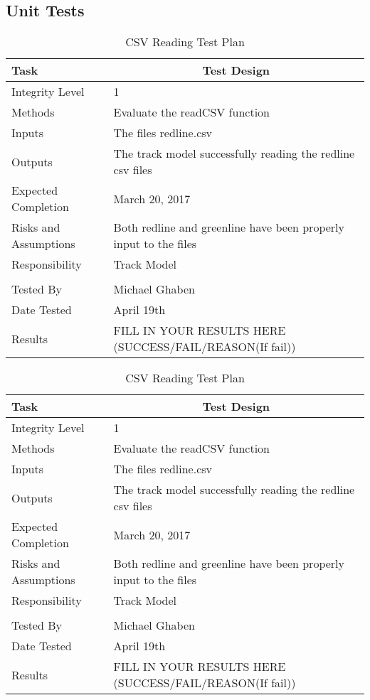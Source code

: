 \documentclass[]{article}
\begin{document}
\subsection{Unit Tests}
\begin{table}[H]
	\centering
	\caption{CSV Reading Test Plan}
	\begin{tabular}{|l|l|}
		\hline
		Task & \multicolumn{1}{c|}{Test Design} \\ \hline
		Integrity Level & 1 \\ \hline
		Methods & Evaluate the readCSV function\\ \hline
		Inputs &  The files redline.csv \\ \hline
		Outputs &  The track model successfully reading the redline csv files\\ \hline
		Expected Completion & March 20, 2017\\ \hline
		Risks and Assumptions & Both redline and greenline have been properly input to the files\\ \hline
		Responsibility & Track Model\\ \hline
		\\ \hline
		Tested By   &  Michael Ghaben\\	\hline
		Date Tested & \parbox[t]{10cm}{April 19th}\\ \hline
		Results & FILL IN YOUR RESULTS HERE (SUCCESS/FAIL/REASON(If fail))\\ \hline
	\end{tabular}
\end{table}
\begin{table}[H]
	\centering
	\caption{CSV Reading Test Plan}
	\begin{tabular}{|l|l|}
		\hline
		Task & \multicolumn{1}{c|}{Test Design} \\ \hline
		Integrity Level & 1 \\ \hline
		Methods & Evaluate the readCSV function\\ \hline
		Inputs &  The files redline.csv \\ \hline
		Outputs &  The track model successfully reading the redline csv files\\ \hline
		Expected Completion & March 20, 2017\\ \hline
		Risks and Assumptions & Both redline and greenline have been properly input to the files\\ \hline
		Responsibility & Track Model\\ \hline
		\\ \hline
		Tested By   &  Michael Ghaben\\	\hline
		Date Tested & \parbox[t]{10cm}{April 19th}\\ \hline
		Results & FILL IN YOUR RESULTS HERE (SUCCESS/FAIL/REASON(If fail))\\ \hline
	\end{tabular}
\end{table}
\end{document}
